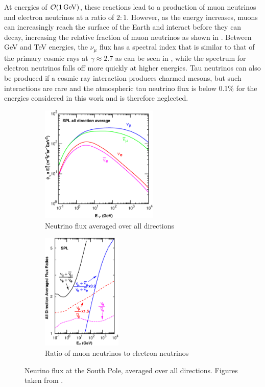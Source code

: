 At energies of $\order{\SI{1}{GeV}}$, these reactions lead to a production of muon neutrinos and electron neutrinos at a ratio of $2:1$.
However, as the energy increases, muons can increasingly reach the surface of the Earth and interact before they can decay, increasing the relative fraction of muon neutrinos as shown in .
Between GeV and TeV energies, the $\nu_\mu$ flux has a spectral index that is similar to that of the primary cosmic rays at $\gamma \approx 2.7$ as can be seen in , while the spectrum for electron neutrinos falls off more quickly at higher energies.
Tau neutrinos can also be produced if a cosmic ray interaction produces charmed mesons, but such interactions are rare and the atmospheric tau neutrino flux is below 0.1\% for the energies considered in this work\cite{fedynitch2015calculation} and is therefore neglected.
\begin{figure}
\centering
\begin{subfigure}[t]{0.55\linewidth}
    \includegraphics[height=2.2in]{figures/flux/alldir-spl.eps}
\caption{Neutrino flux averaged over all directions\label{fig:flux-alldir}}
\end{subfigure}
\hfill
\begin{subfigure}[t]{0.35\linewidth}
    \includegraphics[height=2.2in]{figures/flux/spl-ratio-ally.eps}
\caption{Ratio of muon neutrinos to electron neutrinos\label{fig:flux-numu-ratio}}
\end{subfigure}
\caption{Neurino flux at the South Pole, averaged over all directions. Figures taken from \cite{Honda:2015fha}.}
\end{figure}

